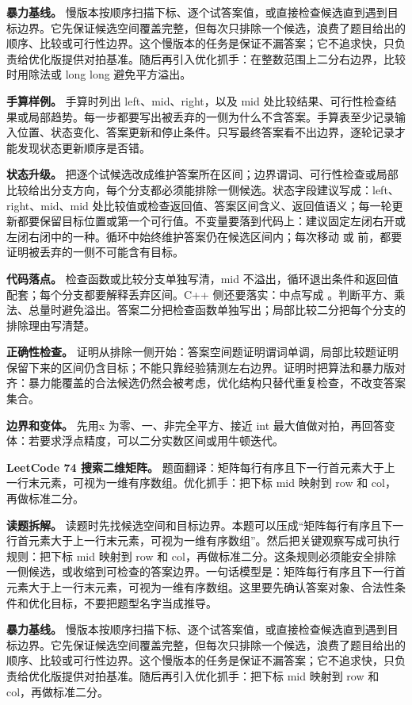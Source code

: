 \textbf{暴力基线。} 慢版本按顺序扫描下标、逐个试答案值，或直接检查候选直到遇到目标边界。它先保证候选空间覆盖完整，但每次只排除一个候选，浪费了题目给出的顺序、比较或可行性边界。这个慢版本的任务是保证不漏答案；它不追求快，只负责给优化版提供对拍基准。随后再引入优化抓手：在整数范围上二分右边界，比较时用除法或 long long 避免平方溢出。

\textbf{手算样例。} 手算时列出 left、mid、right，以及 mid 处比较结果、可行性检查结果或局部趋势。每一步都要写出被丢弃的一侧为什么不含答案。手算表至少记录输入位置、状态变化、答案更新和停止条件。只写最终答案看不出边界，逐轮记录才能发现状态更新顺序是否错。

\textbf{状态升级。} 把逐个试候选改成维护答案所在区间；边界谓词、可行性检查或局部比较给出分支方向，每个分支都必须能排除一侧候选。状态字段建议写成：left、right、mid、mid 处比较值或检查返回值、答案区间含义、返回值语义；每一轮更新都要保留目标位置或第一个可行值。不变量要落到代码上：建议固定左闭右开或左闭右闭中的一种。循环中始终维护答案仍在候选区间内；每次移动  或  前，都要证明被丢弃的一侧不可能含有目标。

\textbf{代码落点。} 检查函数或比较分支单独写清，mid 不溢出，循环退出条件和返回值配套；每个分支都要解释丢弃区间。C++ 侧还要落实：中点写成 。判断平方、乘法、总量时避免溢出。答案二分把检查函数单独写出；局部比较二分把每个分支的排除理由写清楚。

\textbf{正确性检查。} 证明从排除一侧开始：答案空间题证明谓词单调，局部比较题证明保留下来的区间仍含目标；不能只靠经验猜测左右边界。证明时把算法和暴力版对齐：暴力能覆盖的合法候选仍然会被考虑，优化结构只替代重复检查，不改变答案集合。

\textbf{边界和变体。} 先用x 为零、一、非完全平方、接近 int 最大值做对拍，再回答变体：若要求浮点精度，可以二分实数区间或用牛顿迭代。

\noindent\textbf{LeetCode 74 搜索二维矩阵。} 题面翻译：矩阵每行有序且下一行首元素大于上一行末元素，可视为一维有序数组。优化抓手：把下标 mid 映射到 row 和 col，再做标准二分。

\textbf{读题拆解。} 读题时先找候选空间和目标边界。本题可以压成“矩阵每行有序且下一行首元素大于上一行末元素，可视为一维有序数组”。然后把关键观察写成可执行规则：把下标 mid 映射到 row 和 col，再做标准二分。这条规则必须能安全排除一侧候选，或收缩到可检查的答案边界。一句话模型是：矩阵每行有序且下一行首元素大于上一行末元素，可视为一维有序数组。这里要先确认答案对象、合法性条件和优化目标，不要把题型名字当成推导。

\textbf{暴力基线。} 慢版本按顺序扫描下标、逐个试答案值，或直接检查候选直到遇到目标边界。它先保证候选空间覆盖完整，但每次只排除一个候选，浪费了题目给出的顺序、比较或可行性边界。这个慢版本的任务是保证不漏答案；它不追求快，只负责给优化版提供对拍基准。随后再引入优化抓手：把下标 mid 映射到 row 和 col，再做标准二分。

